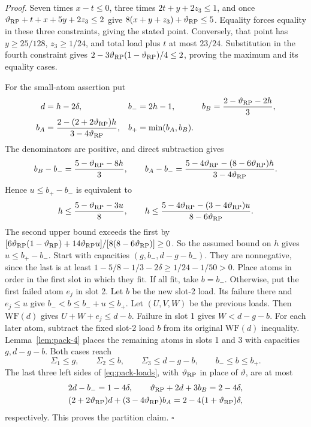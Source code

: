 \emph{Proof.} Seven times $x-t\le0$, three times
$2t+y+2z_3\le1$, and once $\vartheta_{\rm RP}+t+x+5y+2z_3\le2$ give
$8(x+y+z_3)+\vartheta_{\rm RP}\le5$. Equality forces equality in these three
constraints, giving the stated point. Conversely, that point has
$y\ge25/128$, $z_3\ge1/24$, and total load plus $t$ at most
$23/24$. Substitution in the fourth constraint gives
$2-3\vartheta_{\rm RP}(1-\vartheta_{\rm RP})/4\le2$, proving the maximum and its equality cases.

For the small-atom assertion put
\[
\begin{aligned}
 d&=h-2\delta,& b_-&=2h-1,&
 b_B&=\frac{2-\vartheta_{\rm RP}-2h}{3},\\
 b_A&=\frac{2-(2+2\vartheta_{\rm RP})h}{3-4\vartheta_{\rm RP}},&
 b_+&=\min(b_A,b_B).
\end{aligned}
\]
The denominators are positive, and direct subtraction gives
\[
 b_B-b_-=\frac{5-\vartheta_{\rm RP}-8h}{3},\qquad
 b_A-b_-=\frac{5-4\vartheta_{\rm RP}-(8-6\vartheta_{\rm RP})h}{3-4\vartheta_{\rm RP}}.
\]
Hence $u\le b_+-b_-$ is equivalent to
\[
 h\le\frac{5-\vartheta_{\rm RP}-3u}{8},\qquad
 h\le\frac{5-4\vartheta_{\rm RP}-(3-4\vartheta_{\rm RP})u}{8-6\vartheta_{\rm RP}}.
\]
The second upper bound exceeds the first by
$[6\vartheta_{\rm RP}(1-\vartheta_{\rm RP})+14\vartheta_{\rm RP} u]/[8(8-6\vartheta_{\rm RP})]\ge0$.
So the assumed bound on $h$ gives $u\le b_+-b_-$. Start with capacities
$(g,b_-,d-g-b_-)$. They are nonnegative, since the last is at least
$1-5/8-1/3-2\delta\ge1/24-1/50>0$. Place atoms in order in the
first slot in which they fit. If all fit, take $b=b_-$. Otherwise, put the first failed atom $e_j$ in slot 2. Let $b$ be the
new slot-2 load. Its failure there and $e_j\le u$ give
$b_-<b\le b_-+u\le b_+$. Let $(U,V,W)$ be the previous loads.
Then $\mathrm{WF}(d)$ gives $U+W+e_j\le d-b$. Failure in slot 1 gives
$W<d-g-b$. For each later atom, subtract the fixed slot-2 load $b$
from its original $\mathrm{WF}(d)$ inequality. Lemma~\ref{lem:pack-4} places the
remaining atoms in slots 1 and 3 with capacities $g,d-g-b$.
Both cases reach
\[
 \Sigma_1\le g,\qquad\Sigma_2\le b,\qquad
 \Sigma_3\le d-g-b,\qquad b_-\le b\le b_+.
\]
The last three left sides of \eqref{eq:pack-loads}, with $\vartheta_{\rm RP}$ in
place of $\vartheta$, are at most
\[
 \begin{gathered}
 2d-b_-=1-4\delta,\qquad
 \vartheta_{\rm RP}+2d+3b_B=2-4\delta,\\
 (2+2\vartheta_{\rm RP})d+(3-4\vartheta_{\rm RP})b_A=2-4(1+\vartheta_{\rm RP})\delta,
 \end{gathered}
\]
respectively. This proves the partition claim. \hfill$\square$


